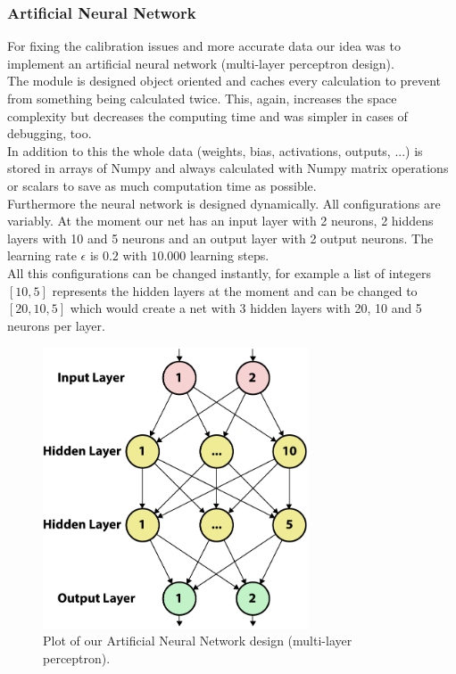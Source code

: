 \documentclass[lnicst,a4paper]{svmultln}
\begin{document}
\subsubsection{Artificial Neural Network}
For fixing the calibration issues and more accurate data our idea was to implement an artificial neural network (multi-layer perceptron design).
\\
The module is designed object oriented and caches every calculation to prevent from something being calculated twice. This, again, increases the space complexity but decreases the computing time and was simpler in cases of debugging, too.
\\
In addition to this the whole data (weights, bias, activations, outputs, ...) is stored in arrays of Numpy and always calculated with Numpy matrix operations or scalars to save as much computation time as possible.
\\
Furthermore the neural network is designed dynamically. All configurations are variably. At the moment our net has an input layer with 2 neurons, 2 hiddens layers with 10 and 5 neurons and an output layer with 2 output neurons. The learning rate $\epsilon$ is $0.2$ with $10.000$ learning steps.
\\
All this configurations can be changed instantly, for example a list of integers $[10, 5]$ represents the hidden layers at the moment and can be changed to $[20, 10, 5]$ which would create a net with 3 hidden layers with 20, 10 and 5 neurons per layer.

\begin{figure}
 	\centerline{\includegraphics[width=0.7\textwidth]{neuralnet1.pdf}}
	{\caption{Plot of our Artificial Neural Network design (multi-layer perceptron).}\label{fig:neuralnet_illustration1}}
\end{figure}
\end{document}
